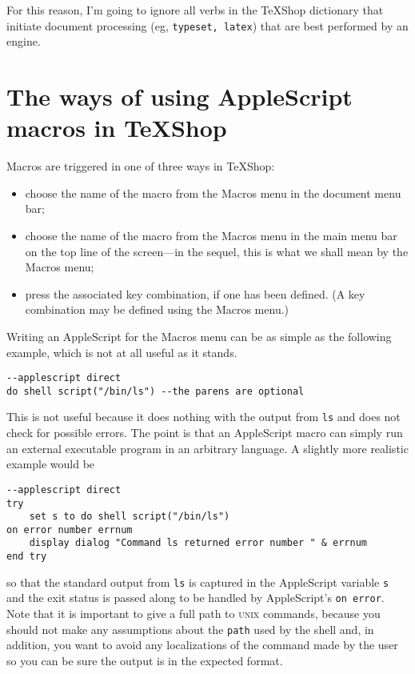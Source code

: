 \documentclass[11pt]{amsart}
\def\UNIX{\textsc{unix}\xspace}
\def\Macros{\textsf{Macros}\xspace}
\begin{document}
For this reason, I'm going to ignore all verbs in the TeXShop dictionary that initiate document processing (eg, {\tt typeset, latex}) that are best performed by an engine.

\section{The ways of using AppleScript macros in TeXShop}
Macros are triggered in one of three ways in TeXShop:
\begin{itemize}
\item
choose the name of the macro from the \textsf{Macros} menu in the document menu bar;
\item
choose the name of the macro from the \textsf{Macros} menu in the main menu bar on the top line of the screen---in the sequel, this is what we shall mean by the \textsf{Macros} menu;
\item press the associated key combination, if one has been defined. (A key combination may be defined using the \textsf{Macros} menu.)
\end{itemize}
Writing an AppleScript for the \Macros menu can be as simple as the following example, which is not at all useful as it stands.
\begin{verbatim}
--applescript direct
do shell script("/bin/ls") --the parens are optional
\end{verbatim}
This is not useful because it does nothing with the output from {\tt ls} and does not check for possible errors. The point is that an AppleScript macro can simply run an external executable program in an arbitrary language. A slightly more realistic example would be
\begin{verbatim}
--applescript direct
try
    set s to do shell script("/bin/ls")
on error number errnum
    display dialog "Command ls returned error number " & errnum
end try
\end{verbatim}
so that the standard output from {\tt ls} is captured in the AppleScript variable {\tt s} and the exit status is passed along to be handled by AppleScript's {\tt on error}. Note that it is important to give a full path to \UNIX commands, because you should not make any assumptions about the {\tt path} used by the shell and, in addition, you want to avoid any localizations of the command made by the user so you can be sure the output is in the expected format.
\end{document}
